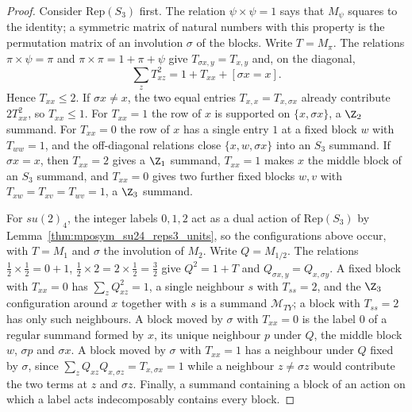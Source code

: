 \begin{proof}
    \leanok
    Consider $\mathrm{Rep}(S_3)$ first. The relation $\psi\times\psi=1$ says
    that $M_\psi$ squares to the identity; a symmetric matrix of natural
    numbers with this property is the permutation matrix of an involution
    $\sigma$ of the blocks. Write $T=M_\pi$. The relations
    $\pi\times\psi=\pi$ and $\pi\times\pi=1+\pi+\psi$ give
    $T_{\sigma x,y}=T_{x,y}$ and, on the diagonal,
    \begin{equation*}
        \sum_z T_{xz}^2=1+T_{xx}+[\sigma x=x].
    \end{equation*}
    Hence $T_{xx}\le2$. If $\sigma x\neq x$, the two equal entries
    $T_{x,x}=T_{x,\sigma x}$ already contribute $2T_{xx}^2$, so
    $T_{xx}\le1$. For $T_{xx}=1$ the row of $x$ is supported on
    $\{x,\sigma x\}$, a $\Z_2$ summand. For $T_{xx}=0$ the row of $x$ has a
    single entry $1$ at a fixed block $w$ with $T_{ww}=1$, and the
    off-diagonal relations close $\{x,w,\sigma x\}$ into an $S_3$ summand. If
    $\sigma x=x$, then $T_{xx}=2$ gives a $\Z_1$ summand, $T_{xx}=1$ makes
    $x$ the middle block of an $S_3$ summand, and $T_{xx}=0$ gives two
    further fixed blocks $w,v$ with $T_{xw}=T_{xv}=T_{wv}=1$, a $\Z_3$
    summand.

    For $su(2)_4$, the integer labels $0,1,2$ act as a dual action of
    $\mathrm{Rep}(S_3)$ by Lemma~\ref{thm:mposym_su24_reps3_units}, so the
    configurations above occur, with $T=M_1$ and $\sigma$ the involution of
    $M_2$. Write $Q=M_{1/2}$. The relations $\tfrac12\times\tfrac12=0+1$,
    $\tfrac12\times2=2\times\tfrac12=\tfrac32$ give $Q^2=1+T$ and
    $Q_{\sigma x,y}=Q_{x,\sigma y}$. A fixed block with $T_{xx}=0$ has
    $\sum_zQ_{xz}^2=1$, a single neighbour $s$ with $T_{ss}=2$, and the
    $\Z_3$ configuration around $x$ together with $s$ is a summand
    $\mathcal M_{TY}$; a block with $T_{ss}=2$ has only such neighbours. A
    block moved by $\sigma$ with $T_{xx}=0$ is the label $0$ of a regular
    summand formed by $x$, its unique neighbour $p$ under $Q$, the middle
    block $w$, $\sigma p$ and $\sigma x$. A block moved by $\sigma$ with
    $T_{xx}=1$ has a neighbour under $Q$ fixed by $\sigma$, since
    $\sum_zQ_{xz}Q_{x,\sigma z}=T_{x,\sigma x}=1$ while a neighbour
    $z\neq\sigma z$ would contribute the two terms at $z$ and $\sigma z$.
    Finally, a summand containing a block of an action on which a label acts
    indecomposably contains every block.
\end{proof}

